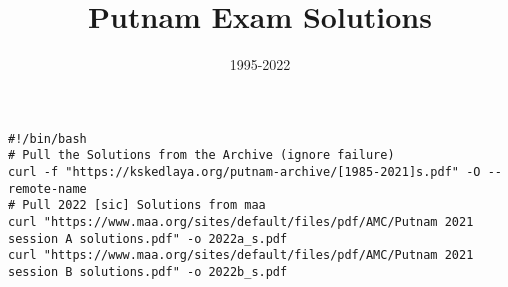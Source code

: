 \documentclass{article}
\title{Putnam Exam Solutions}
\date{1995-2022}
\author{}
\begin{document}
\maketitle
\begin{center}
\begin{BVerbatim}
#!/bin/bash
# Pull the Solutions from the Archive (ignore failure)
curl -f "https://kskedlaya.org/putnam-archive/[1985-2021]s.pdf" -O --remote-name
# Pull 2022 [sic] Solutions from maa
curl "https://www.maa.org/sites/default/files/pdf/AMC/Putnam 2021 session A solutions.pdf" -o 2022a_s.pdf
curl "https://www.maa.org/sites/default/files/pdf/AMC/Putnam 2021 session B solutions.pdf" -o 2022b_s.pdf
\end{BVerbatim}
\end{center}
\newpage




























\end{document}

